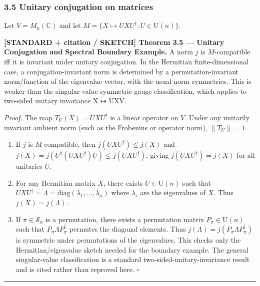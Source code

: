 \documentclass[
  11pt,
]{article}
\providecommand{\tightlist}{%
  \setlength{\itemsep}{0pt}\setlength{\parskip}{0pt}}
\providecommand{\tightlist}{%
  \setlength{\itemsep}{0pt}\setlength{\parskip}{0pt}}
\begin{document}
\subsubsection{3.5 Unitary conjugation on matrices}\label{unitary-conjugation-on-matrices}

Let \(V = M_n(\mathbb{C})\) and let \(M = \{X \mapsto U X U^\dagger : U \in \mathrm{U}(n)\}\).

\textbf{{[}STANDARD + citation / SKETCH{]} Theorem 3.5 --- Unitary Conjugation and Spectral Boundary Example.} A norm \(j\) is \(M\)-compatible iff it is invariant under unitary conjugation. In the Hermitian finite-dimensional case, a conjugation-invariant norm is determined by a permutation-invariant norm/function of the eigenvalue vector, with the usual norm symmetries. This is weaker than the singular-value symmetric-gauge classification, which applies to two-sided unitary invariance X ↦ UXV.

\emph{Proof.} The map \(T_U(X) = U X U^\dagger\) is a linear operator on \(V\). Under any unitarily invariant ambient norm (such as the Frobenius or operator norm), \(\|T_U\| = 1\).

\begin{enumerate}
\def\labelenumi{\arabic{enumi}.}
\tightlist
\item
  If \(j\) is \(M\)-compatible, then \(j(U X U^\dagger) \leq j(X)\) and \(j(X) = j(U^\dagger(U X U^\dagger) U) \leq j(U X U^\dagger)\), giving \(j(U X U^\dagger) = j(X)\) for all unitaries \(U\).
\item
  For any Hermitian matrix \(X\), there exists \(U \in \mathrm{U}(n)\) such that \(U X U^\dagger = \Lambda = \mathrm{diag}(\lambda_1, \dots, \lambda_n)\) where \(\lambda_i\) are the eigenvalues of \(X\). Thus \(j(X) = j(\Lambda)\).
\item
  If \(\pi \in \mathcal{S}_n\) is a permutation, there exists a permutation matrix \(P_\pi \in \mathrm{U}(n)\) such that \(P_\pi \Lambda P_\pi^\dagger\) permutes the diagonal elements. Thus \(j(\Lambda) = j(P_\pi \Lambda P_\pi^\dagger)\) is symmetric under permutations of the eigenvalues. This checks only the Hermitian/eigenvalue sketch needed for the boundary example. The general singular-value classification is a standard two-sided-unitary-invariance result and is cited rather than reproved here. \(\square\)
\end{enumerate}

\begin{center}\rule{0.5\linewidth}{0.5pt}\end{center}
\end{document}
